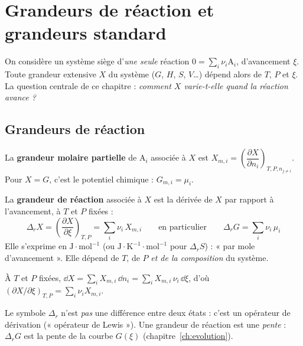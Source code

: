 \chapter{Grandeurs de réaction et grandeurs standard}
\label{ch:grandeurs}

On considère un système siège d'\emph{une seule} réaction $0 = \sum_i\nu_i\mathrm{A}_i$, d'avancement $\xi$. Toute grandeur extensive $X$ du système ($G$, $H$, $S$, $V$\dots) dépend alors de $T$, $P$ et $\xi$. La question centrale de ce chapitre : \emph{comment $X$ varie-t-elle quand la réaction avance ?}

\section{Grandeurs de réaction}

\begin{definition}
La \textbf{grandeur molaire partielle} de $\mathrm{A}_i$ associée à $X$ est $X_{m,i} = \left(\dfrac{\partial X}{\partial n_i}\right)_{T,P,n_{j\neq i}}$. Pour $X = G$, c'est le potentiel chimique : $G_{m,i} = \mu_i$.
\end{definition}

\begin{definition}
La \textbf{grandeur de réaction} associée à $X$ est la dérivée de $X$ par rapport à l'avancement, à $T$ et $P$ fixées :
\[ \boxed{\Delta_r X = \left(\frac{\partial X}{\partial \xi}\right)_{T,P} = \sum_i \nu_i\,X_{m,i}} \qquad\text{en particulier}\qquad \boxed{\Delta_r G = \sum_i \nu_i\,\mu_i} \]
Elle s'exprime en $\mathrm{J\cdot mol^{-1}}$ (ou $\mathrm{J\cdot K^{-1}\cdot mol^{-1}}$ pour $\Delta_rS$) : « par mole d'avancement ». Elle dépend de $T$, de $P$ \emph{et de la composition} du système.
\end{definition}

\begin{demo}
À $T$ et $P$ fixées, $\dd X = \sum_i X_{m,i}\,\dd n_i = \sum_i X_{m,i}\,\nu_i\,\dd\xi$, d'où $\left(\partial X/\partial\xi\right)_{T,P} = \sum_i\nu_iX_{m,i}$.
\end{demo}

Le symbole $\Delta_r$ n'est \emph{pas} une différence entre deux états : c'est un opérateur de dérivation (« opérateur de Lewis »). Une grandeur de réaction est une \emph{pente} : $\Delta_rG$ est la pente de la courbe $G(\xi)$ (chapitre~\ref{ch:evolution}).

